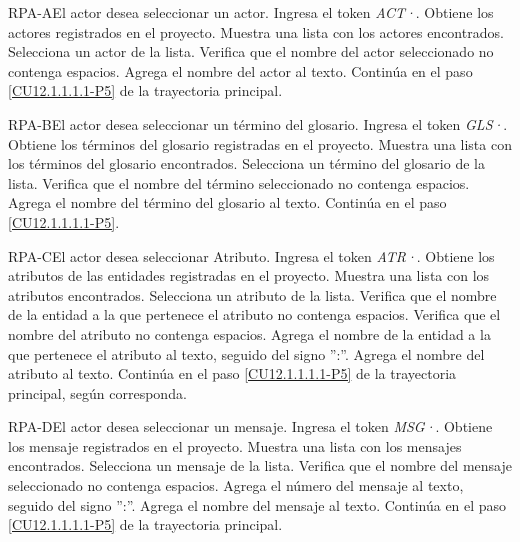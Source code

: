 	\begin{UCtrayectoriaA}{RPA-A}{El actor desea seleccionar un actor.}
		\UCpaso[\UCactor] Ingresa el token {\em ACT·}.
		\UCpaso[\UCsist] Obtiene los actores registrados en el proyecto. 
		\UCpaso[\UCsist] Muestra una lista con los actores encontrados.
		\UCpaso[\UCactor] Selecciona un actor de la lista.
		\UCpaso[\UCsist] Verifica que el nombre del actor seleccionado no contenga espacios. 
		\UCpaso[\UCsist] Agrega el nombre del actor al texto.
		\UCpaso Continúa en el paso \ref{CU12.1.1.1.1-P5} de la trayectoria principal.
	\end{UCtrayectoriaA}

	\begin{UCtrayectoriaA}{RPA-B}{El actor desea seleccionar un término del glosario.}
		\UCpaso[\UCactor] Ingresa el token {\em GLS·}.
		\UCpaso[\UCsist] Obtiene los términos del glosario registradas en el proyecto. 
		\UCpaso[\UCsist] Muestra una lista con los términos del glosario encontrados.
		\UCpaso[\UCactor] Selecciona un término del glosario de la lista.
		\UCpaso[\UCsist] Verifica que el nombre del término seleccionado no contenga espacios. 
		\UCpaso[\UCsist] Agrega el nombre del término del glosario al texto.
		\UCpaso Continúa en el paso \ref{CU12.1.1.1.1-P5}.
	\end{UCtrayectoriaA}

	\begin{UCtrayectoriaA}{RPA-C}{El actor desea seleccionar Atributo.}
		\UCpaso[\UCactor] Ingresa el token {\em ATR·}. 
		\UCpaso[\UCsist] Obtiene los atributos de las entidades registradas en el proyecto.
		\UCpaso[\UCsist] Muestra una lista con los atributos encontrados.
		\UCpaso[\UCactor] Selecciona un atributo de la lista.
		\UCpaso[\UCsist] Verifica que el nombre de la entidad a la que pertenece el atributo no contenga espacios. 
		\UCpaso[\UCsist] Verifica que el nombre del atributo no contenga espacios. 
		\UCpaso[\UCsist] Agrega el nombre de la entidad a la que pertenece el atributo al texto, seguido del signo '':''.
		\UCpaso[\UCsist] Agrega el nombre del atributo al texto.
		\UCpaso Continúa en el paso \ref{CU12.1.1.1.1-P5} de la trayectoria principal, según corresponda.
	\end{UCtrayectoriaA}

	\begin{UCtrayectoriaA}{RPA-D}{El actor desea seleccionar un mensaje.}
		\UCpaso[\UCactor] Ingresa el token {\em MSG·}. 
		\UCpaso[\UCsist] Obtiene los mensaje registrados en el proyecto.
		\UCpaso[\UCsist] Muestra una lista con los mensajes encontrados.
		\UCpaso[\UCactor] Selecciona un mensaje de la lista.
		\UCpaso[\UCsist] Verifica que el nombre del mensaje seleccionado no contenga espacios. 
		\UCpaso[\UCsist] Agrega el número del mensaje al texto, seguido del signo '':''.
		\UCpaso[\UCsist] Agrega el nombre del mensaje al texto.
		\UCpaso Continúa en el paso \ref{CU12.1.1.1.1-P5} de la trayectoria principal.
	\end{UCtrayectoriaA}

